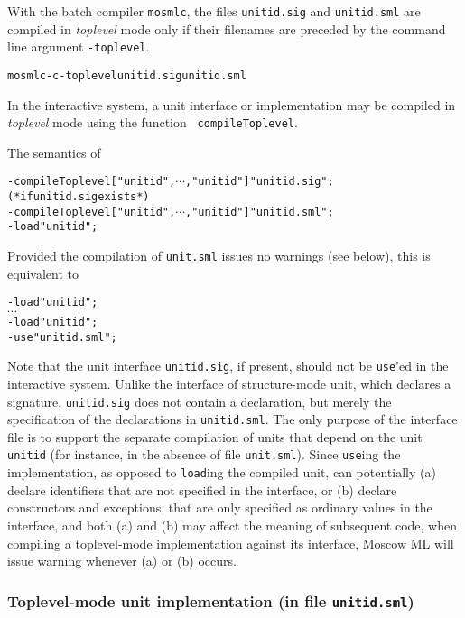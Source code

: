 \documentclass[fleqn,a4paper]{article}
\def\allttcdots{\ensuremath{\cdots}}
\begin{document}
With the batch compiler {\tt mosmlc}, the files {\tt unitid.sig} and
{\tt unitid.sml} are compiled in \emph{toplevel} mode only if their
filenames are preceded by the command line argument {\tt -toplevel}.

\begin{alltt}
   mosmlc -c -toplevel unitid.sig unitid.sml
\end{alltt}

\noindent 
In the interactive system, a unit interface or implementation may be
compiled in \emph{toplevel} mode using the function {\tt
  compileToplevel}.

The semantics of
\begin{alltt}
   - compileToplevel ["unitid\et",\allttcdots,"unitid\n"] "unitid.sig"; (* if unitid.sig exists *) 
   - compileToplevel ["unitid\et",\allttcdots,"unitid\n"] "unitid.sml";
   - load "unitid";
\end{alltt}

\noindent Provided the compilation of {\tt unit.sml} issues no warnings (see below), this is equivalent to

\begin{alltt}
   - load "unitid\et";
   \allttcdots
   - load "unitid\n";
   - use "unitid.sml";
\end{alltt}

Note that the unit interface {\tt unitid.sig}, if present, should not be {\tt use}'ed in the interactive system.
Unlike the interface of structure-mode unit, which declares a signature, {\tt unitid.sig} does not contain a declaration,
but merely the specification of the declarations in {\tt unitid.sml}. 
The only purpose of  the interface file is to support the separate compilation of units that depend on the unit
{\tt unitid} (for instance, in the absence of file {\tt unit.sml}). Since  {\tt use}ing the implementation, as
opposed to {\tt load}ing  the compiled unit,
can potentially (a)  declare identifiers that are not specified in
the interface, or (b) declare constructors and exceptions, that are only specified as ordinary values in the interface,
and both (a) and (b) may affect the meaning of subsequent code, when compiling a toplevel-mode implementation 
against its interface, Moscow ML will issue warning whenever (a) or (b) occurs.




\subsubsection*{Toplevel-mode unit implementation (in file {\tt unitid.sml})}
\end{document}

